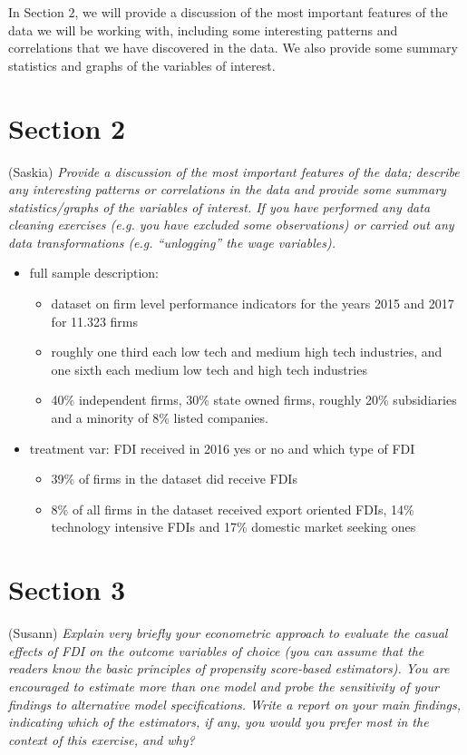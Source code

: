 \documentclass[11pt,a4paper,leqno]{article}
\begin{document}
In Section $2$, we will provide a discussion of the most important features of the data we will be working with, including some interesting patterns and correlations that we have discovered in the data. We also provide some summary statistics and graphs of the variables of interest.

\section*{Section 2} (Saskia)
\textit{Provide a discussion of the most important features of the data; describe any interesting patterns or correlations in the data and provide some summary statistics/graphs of the variables of interest. If you have performed any data cleaning exercises (e.g. you have excluded some observations) or carried out any data transformations (e.g. “unlogging” the wage variables).}

\begin{itemize}
	\item full sample description:
	\begin{itemize}
		\item dataset on firm level performance indicators for the years 2015 and 2017 for 11.323 firms  
		\item roughly one third each low tech and medium high tech industries, and one sixth each medium low tech and high tech industries
		\item 40\% independent firms, 30\% state owned firms, roughly 20\% subsidiaries and a minority of 8\% listed companies.  
	\end{itemize}
	\item treatment var: FDI received in 2016 yes or no and which type of FDI
	\begin{itemize}
		\item 39\% of firms in the dataset did receive FDIs
		\item 8\% of all firms in the dataset received export oriented FDIs, 14\% technology intensive FDIs and 17\% domestic market seeking ones
	\end{itemize}

\end{itemize}

\section*{Section 3} (Susann)
\textit{Explain very briefly your econometric approach to evaluate the casual effects of FDI on the outcome variables of choice (you can assume that the readers know the basic principles of propensity score-based estimators). You are encouraged to estimate more than one model and probe the sensitivity of your findings to alternative model specifications. Write a report on your main findings, indicating which of the estimators, if any, you would you prefer most in the context of this exercise, and why?}
\end{document}
